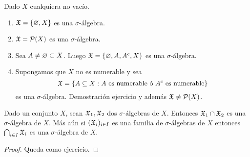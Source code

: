 \begin{eg}
    Dado $X$ cualquiera no vacío.
    \begin{enumerate}
        \item $\mathfrak{X} = \{ \varnothing, X \}$ es una $\sigma$-álgebra.
        \item $\mathfrak{X} = \mathcal{P}(X)$ es una $\sigma$-álgebra.
        \item Sea $A \neq \varnothing \subset X$. Luego $\mathfrak{X} = \{ \varnothing, A, A^c, X \}$ es una $\sigma$-álgebra.
        \item Supongamos que $X$ no es numerable y sea
              \begin{equation*}
                  \mathfrak{X} = \{ A \subseteq X : A \text{ es numerable ó } A^c \text{ es numerable} \}
              \end{equation*}
              es una $\sigma$-álgebra. Demostración ejercicio y además $\mathfrak{X} \neq \mathcal{P}(X)$.
    \end{enumerate}
\end{eg}

\begin{lemma}
    Dado un conjunto $X$, sean $\mathfrak{X}_1, \mathfrak{X}_2$ dos $\sigma$-álgebras de $X$. Entonces $\mathfrak{X}_1 \cap \mathfrak{X}_2$ es una $\sigma$-álgebra de $X$.
    Más aún si $(\mathfrak{X}_i)_{i \in I}$ es una familia de $\sigma$-álgebras de $X$ entonces $\bigcap_{i \in I} \mathfrak{X}_i$ es una $\sigma$-álgebra de $X$.
    \begin{proof}
        Queda como ejercicio.
    \end{proof}
\end{lemma}

\clearpage

